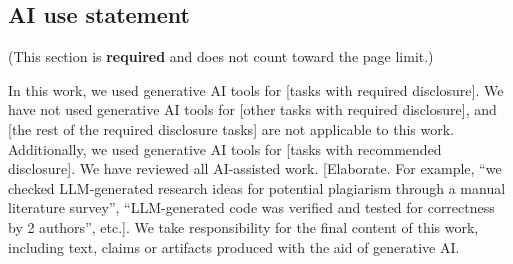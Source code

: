 \documentclass{article} %
\begin{document}

















\newpage

\subsection*{AI use statement}

(This section is \textbf{required} and does not count toward the page limit.)

In this work, we used generative AI tools for [tasks with required disclosure].
We have not used generative AI tools for [other tasks with required disclosure],
and [the rest of the required disclosure tasks] are not applicable to this work.
Additionally, we used generative AI tools for [tasks with recommended
disclosure]. We have reviewed all AI-assisted work. [Elaborate. For example, “we
checked LLM-generated research ideas for potential plagiarism through a manual
literature survey”, “LLM-generated code was verified and tested for correctness
by 2 authors”, etc.]. We take responsibility for the final content of this work,
including text, claims or artifacts produced with the aid of generative AI.
\end{document}
